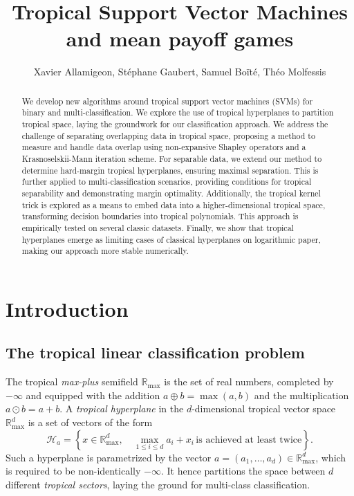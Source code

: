 \documentclass[oneside,english,a4paper]{amsart}
\numberwithin{equation}{section}
\numberwithin{figure}{section}
\theoremstyle{plain}
\theoremstyle{definition}
\theoremstyle{plain}
\theoremstyle{remark}
\theoremstyle{plain}
\theoremstyle{definition}
\theoremstyle{definition}
\begin{document}
\title{Tropical Support Vector Machines and mean payoff games}
\author{Xavier Allamigeon, Stéphane Gaubert, Samuel Boïté, Théo Molfessis}
\maketitle

\begin{abstract}
    We develop new algorithms around tropical support vector machines (SVMs) for binary and multi-classification. We explore the use of tropical hyperplanes to partition tropical space, laying the groundwork for our classification approach. We address the challenge of separating overlapping data in tropical space, proposing a method to measure and handle data overlap using non-expansive Shapley operators and a Krasnoselskii-Mann iteration scheme. For separable data, we extend our method to determine hard-margin tropical hyperplanes, ensuring maximal separation. This is further applied to multi-classification scenarios, providing conditions for tropical separability and demonstrating margin optimality. Additionally, the tropical kernel trick is explored as a means to embed data into a higher-dimensional tropical space, transforming decision boundaries into tropical polynomials. This approach is empirically tested on several classic datasets. Finally, we show that tropical hyperplanes emerge as limiting cases of classical hyperplanes on logarithmic paper, making our approach more stable numerically.
\end{abstract}

\section{Introduction}

\subsection*{The tropical linear classification problem}


The tropical \emph{max-plus} semifield $\mathbb{R}_{\max}$ is the
set of real numbers, completed by $-\infty$ and equipped with the
addition $a\oplus b=\max(a,b)$ and the multiplication $a\odot b=a+b$.
A \emph{tropical hyperplane} in the $d$-dimensional tropical vector
space $\mathbb{R}_{\max}^{d}$ is a set of vectors of the form
\[
\mathcal{H}_{a}=\left\{x\in\mathbb{R}_{\max}^{d},\quad\max_{1\le i\le d}a_{i}+x_{i}\,\text{is achieved at least twice}\right\}.
\]
Such a hyperplane is parametrized by the vector $a=(a_{1},\ldots,a_{d})\in\mathbb{R}_{\max}^{d}$,
which is required to be non-identically $-\infty$. It hence partitions
the space between $d$ different \emph{tropical sectors}, laying the
ground for multi-class classification.
\end{document}
